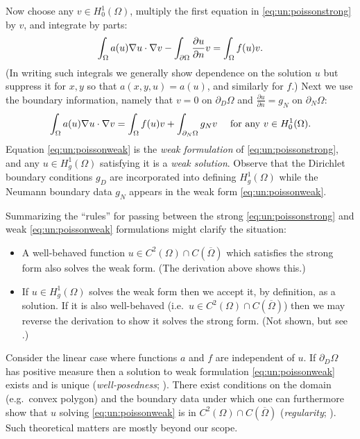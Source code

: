 Now choose any $v\in H_{0}^1(\Omega)$, multiply the first equation in \eqref{eq:un:poissonstrong} by $v$, and integrate by parts:
\begin{equation*}
\int_\Omega a(u) \nabla u \cdot \nabla v - \int_{\partial\Omega} \frac{\partial u}{\partial n} v = \int_\Omega f(u) v.
\end{equation*}
(In writing such integrals we generally show dependence on the solution $u$ but suppress it for $x,y$ so that $a(x,y,u)=a(u)$, and similarly for $f$.)  Next we use the boundary information, namely that $v=0$ on $\partial_D\Omega$ and $\frac{\partial u}{\partial n}=g_N$ on $\partial_N\Omega$:
\begin{equation}
\int_\Omega a(u) \nabla u \cdot \nabla v = \int_\Omega f(u) v + \int_{\partial_N\Omega} g_N v\quad \text{ for any } v\in H_{0}^1(\Omega). \label{eq:un:poissonweak}
\end{equation}
Equation \eqref{eq:un:poissonweak} is the \emph{weak formulation} of \eqref{eq:un:poissonstrong}, and any $u \in H_{g}^1(\Omega)$ satisfying it is a \emph{weak solution}.  Observe that the Dirichlet boundary conditions $g_D$ are incorporated into defining $H_{g}^1(\Omega)$ while the Neumann boundary data $g_N$ appears in the weak form \eqref{eq:un:poissonweak}.

Summarizing the ``rules'' for passing between the strong \eqref{eq:un:poissonstrong} and weak \eqref{eq:un:poissonweak} formulations might clarify the situation:\begin{itemize}
\item A well-behaved function $u \in C^2(\Omega) \cap C(\overline \Omega)$ which satisfies the strong form also solves the weak form.  (The derivation above shows this.)
\item If $u \in H_{g}^1(\Omega)$ solves the weak form then we accept it, by definition, as a solution.   If it is also well-behaved (i.e.~$u \in C^2(\Omega) \cap C(\overline \Omega)$) then we may reverse the derivation to show it solves the strong form.  (Not shown, but see \citet{Evans2010}.)
\end{itemize}

Consider the linear case where functions $a$ and $f$ are independent of $u$.  If $\partial_D \Omega$ has positive measure then a solution to weak formulation \eqref{eq:un:poissonweak} exists and is unique (\emph{well-posedness}; \citep{Ciarlet2002,Evans2010}).  There exist conditions on the domain (e.g.~convex polygon) and the boundary data under which one can furthermore show that $u$ solving \eqref{eq:un:poissonweak} is in $C^2(\Omega) \cap C(\overline \Omega)$ (\emph{regularity}; \citep{Evans2010}).  Such theoretical matters are mostly beyond our scope.


